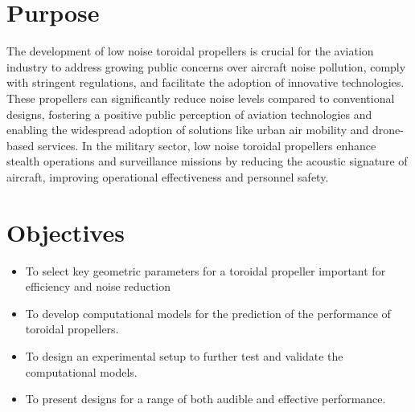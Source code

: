 \documentclass[a2,portrait]{a0poster}
\begin{document}
\begin{multicols}{2} %



\color{Navy}
\section*{Purpose}

The development of low noise toroidal propellers is crucial for the aviation industry to address growing public concerns over aircraft noise pollution, comply with stringent regulations, and facilitate the adoption of innovative technologies.
These propellers can significantly reduce noise levels compared to conventional designs, fostering a positive public perception of aviation technologies and enabling the widespread adoption of solutions like urban air mobility and drone-based services.
In the military sector, low noise toroidal propellers enhance stealth operations and surveillance missions by reducing the acoustic signature of aircraft, improving operational effectiveness and personnel safety.


\color{Navy} 
\section*{Objectives}

\begin{itemize}
\item To select key geometric parameters for a toroidal propeller important for efficiency and noise reduction
\item To develop computational models for the prediction of the performance of toroidal propellers.
\item To design an experimental setup to further test and validate the computational models.
\item To present designs for a range of both audible and effective performance.
\end{itemize}



\end{multicols}
\end{document}
